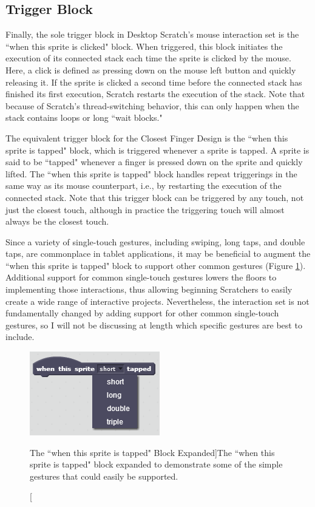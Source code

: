\subsection{Trigger Block}
Finally, the sole trigger block in Desktop Scratch's mouse interaction set is the ``when this sprite is clicked" block. When triggered, this block initiates the execution of its connected stack each time the sprite is clicked by the mouse. Here, a click is defined as pressing down on the mouse left button and quickly releasing it. If the sprite is clicked a second time before the connected stack has finished its first execution, Scratch restarts the execution of the stack. Note that because of Scratch's thread-switching behavior, this can only happen when the stack contains loops or long ``wait blocks." 

The equivalent trigger block for the Closest Finger Design is the ``when this sprite is tapped" block, which is triggered whenever a sprite is tapped. A sprite is said to be ``tapped" whenever a finger is pressed down on the sprite and quickly lifted. The ``when this sprite is tapped" block handles repeat triggerings in the same way as its mouse counterpart, i.e., by restarting the execution of the connected stack. Note that this trigger block can be triggered by any touch, not just the closest touch, although in practice the triggering touch will almost always be the closest touch.

Since a variety of single-touch gestures, including swiping, long taps, and double taps, are commonplace in tablet applications, it may be beneficial to augment the ``when this sprite is tapped" block to support other common gestures (Figure \ref{When_This_Sprite_Is_Tapped}). Additional support for common single-touch gestures lowers the floors to implementing those interactions, thus allowing beginning Scratchers to easily create a wide range of interactive projects. Nevertheless, the interaction set is not fundamentally changed by adding support for other common single-touch gestures, so I will not be discussing at length which specific gestures are best to include.

\begin{figure}
\centering
\includegraphics{images/When_This_Sprite_Is_Tapped.PNG}
\caption[The ``when this sprite is tapped" Block Expanded]{The ``when this sprite is tapped" block expanded to demonstrate some of the simple gestures that could easily be supported.}
\label{When_This_Sprite_Is_Tapped}
\end{figure}

